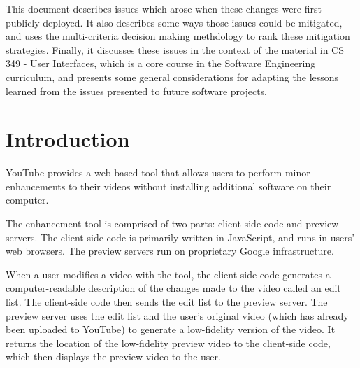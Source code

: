 \documentclass[se,resubmit]{uw-wkrpt}
\begin{document}
This document describes issues which arose when these changes were first
publicly deployed. It also describes some ways those issues could be mitigated,
and uses the multi-criteria decision making methdology to rank these mitigation
strategies. Finally, it discusses these issues in the context of the material in
CS 349 - User Interfaces, which is a core course in the Software Engineering
curriculum, and presents some general considerations for adapting the lessons
learned from the issues presented to future software projects.

\tableofcontents
\listoffigures
\listoftables

\mainmatter

\section{Introduction}\label{sec:intro}
YouTube provides a web-based tool that allows users to perform minor
enhancements to their videos without installing additional software on their
computer.

The enhancement tool is comprised of two parts: client-side code and preview
servers. The client-side code is primarily written in JavaScript, and runs in
users' web browsers. The preview servers run on proprietary Google
infrastructure.

When a user modifies a video with the tool, the client-side code generates a
computer-readable description of the changes made to the video called an edit
list. The client-side code then sends the edit list to the preview server. The
preview server uses the edit list and the user's original video (which has
already been uploaded to YouTube) to generate a low-fidelity version of the
video. It returns the location of the low-fidelity preview video to the
client-side code, which then displays the preview video to the user.
\end{document}
